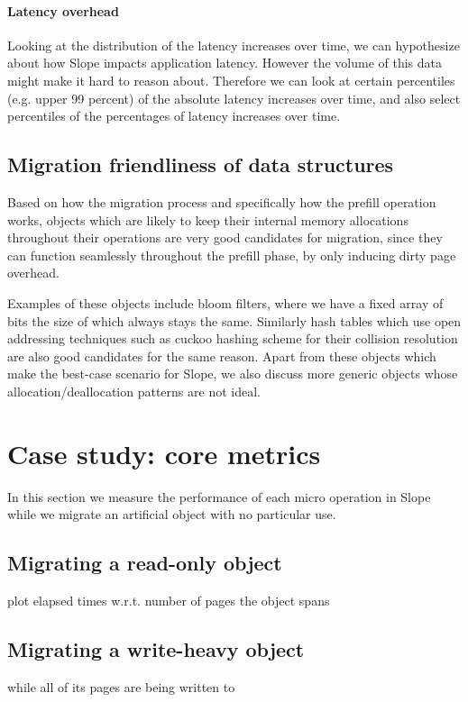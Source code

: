 \paragraph{Latency overhead}
Looking at the distribution of the latency increases over time, we can
hypothesize about how Slope impacts application latency. However the volume of
this data might make it hard to reason about. Therefore we can look at certain
percentiles (e.g. upper 99 percent) of the absolute latency increases over time,
and also select percentiles of the percentages of latency increases over time.


\subsection{Migration friendliness of data structures}
Based on how the migration process and specifically how the prefill operation
works, objects which are likely to keep their internal memory allocations
throughout their operations are very good candidates for migration, since they
can function seamlessly throughout the prefill phase, by only inducing dirty
page overhead.

Examples of these objects include bloom filters, where we have a fixed
array of bits the size of which always stays the same.
Similarly hash tables which use open addressing techniques such as cuckoo
hashing scheme for their collision resolution are also good candidates for the
same reason.
Apart from these objects which make the best-case scenario for Slope, we also
discuss more generic objects whose allocation/deallocation patterns are not
ideal.

\section{Case study: core metrics}
In this section we measure the performance of each micro operation in Slope
while we migrate an artificial object with no particular use.

\subsection{Migrating a read-only object}
plot elapsed times w.r.t. number of pages the object spans

\subsection{Migrating a write-heavy object}
while all of its pages are being written to

